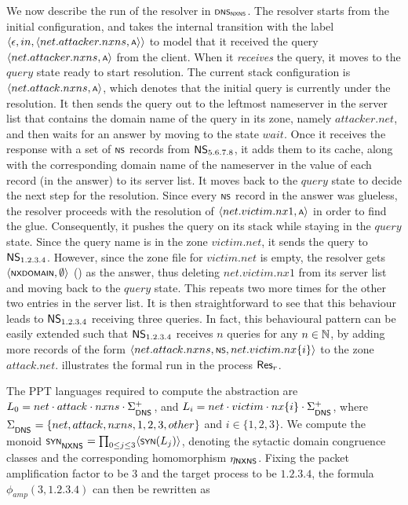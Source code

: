 {\begin{example}
We now describe the run of the resolver in $\scrsf{dns_{nxns}}$. The resolver starts from the initial configuration, and takes the internal transition with the label $\tup{\epsilon, in, \tup{net.attacker.nxns,\scrsf{a}}}$ to model that it received the query $\tup{net.attacker.nxns,\scrsf{a}}$ from the client. When it \emph{receives} the query, it moves to the $query$ state ready to start resolution. The current stack configuration is $\tup{net.attack.nxns,\scrsf{a}}$, which denotes that the initial query is currently under the resolution. It then sends the query out to the leftmost nameserver in the server list that contains the domain name of the query in its zone, namely $attacker.net$, and then waits for an answer by moving to the state $wait$. Once it receives the response with a set of  $\scrsf{ns}$ records from $\mathsf{NS}_{5.6.7.8}$, it adds them to its cache, along with the corresponding domain name of the nameserver in the value of each record (in the answer) to its server list. It moves back to the $query$ state to decide the next step for the resolution. Since every $\scrsf{ns}$ record in the answer was glueless, the resolver proceeds with the resolution of $\tup{net.victim.nx1,\scrsf{a}}$ in order to find the glue. Consequently, it pushes the query on its stack while staying in the $query$ state. Since the query name is in the zone $victim.net$, it sends the query to $\mathsf{NS}_{1.2.3.4}$. However, since the zone file for $victim.net$ is empty, the resolver gets $\tup{\scrsf{nxdomain},\emptyset}$ () as the answer, thus deleting $net.victim.nx1$ from its server list and moving back to the $query$ state. This repeats two more times for the other two entries in the server list. It is then straightforward to see that this behaviour leads to $\mathsf{NS}_{1.2.3.4}$ receiving three queries. In fact, this behavioural pattern can be easily extended such that $\mathsf{NS}_{1.2.3.4}$ receives $n$ queries for any $n \in \mathbb{N}$, by adding more records of the form $\tup{net.attack.nxns,\scrsf{ns},net.victim.nx\{i\}}$ to the zone $attack.net$.  illustrates the formal run in the process $\mathsf{Res}_{r}$.






The PPT languages required to compute the abstraction are $L_0 = net\cdot attack\cdot nxns \cdot \dnsAlph^+$, and $L_i = net\cdot victim\cdot nx\{i\}\cdot \dnsAlph^+$, where $\dnsAlph = \{net, attack, nxns, 1, 2, 3, other\}$ and $i \in \{1, 2, 3\}$. We  compute the monoid $\scrsf{syn}\subsub{\scrsf{nxns}} = \prod_{0 \leq j \leq 3}\tup{\synmon{L_j}}$, denoting the sytactic domain congruence classes and the corresponding homomorphism $\synhom{\scrsf{nxns}}$. Fixing the packet amplification factor to be $3$ and the target process to be $1.2.3.4$, the formula $\phi_{amp}(3, 1.2.3.4)$ can then be rewritten as


\end{example}}
